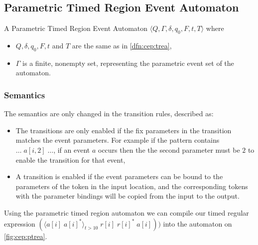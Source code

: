 		\subsection{Parametric Timed Region Event Automaton}
			
			

			\begin{dfn}
				\label{dfn:cep:ptrea}
				A Parametric Timed Region Event Automaton $\langle Q,\Gamma,\delta,q_0, F, t, T \rangle$ where
				\begin{itemize}
					\item $Q, \delta, q_0, F, t$ and  $T$ are the same as in \cref{dfn:cep:trea},
					\item $\Gamma$ is a finite, nonempty set, representing the parametric event set of the automaton.
				\end{itemize}
			\end{dfn}

			\subsubsection{Semantics}
			\label{cep:trea:semantics}

			The semantics are only changed in the transition rules, described as:
			\begin{itemize}
				\item The transitions are only enabled if the fix parameters in the transition matches the event parameters. For example if the pattern contains $\dots \; a[i,2] \; \dots$, if an event $a$ occurs then the the second parameter must be $2$ to enable the transition for that event,
				\item A transition is enabled if the event parameters can be bound to the parameters of the token in the input location, and the corresponding tokens with the parameter bindings will be copied from the input to the output.
			\end{itemize}
	
			Using the parametric timed region automaton we can compile our timed regular expression 
			$(\langle a[i] \;  a[i]^\ast \rangle_{t > 10} \; r[i] \; r[i]^\ast \; a[i]) )$ into the automaton on \cref{fig:cep:ptrea}.
	
